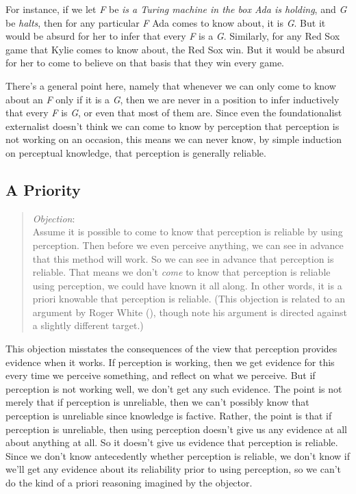 \documentclass[
  10pt,
  letterpaper,
  twoside]{scrbook}
\begin{document}
For instance, if we let \emph{F} be \emph{is a Turing machine in the box
Ada is holding}, and \emph{G} be \emph{halts}, then for any particular
\emph{F} {Ada} comes to know about, it is \emph{G}. But it would be
absurd for her to infer that every \emph{F} is a \emph{G}. Similarly,
for any Red Sox game that {Kylie} comes to know about, the Red Sox win.
But it would be absurd for her to come to believe on that basis that
they win every game.

There's a general point here, namely that whenever we can only come to
know about an \emph{F} only if it is a \emph{G}, then we are never in a
position to infer inductively that every \emph{F} is \emph{G}, or even
that most of them are. Since even the foundationalist externalist
doesn't think we can come to know by perception that perception is not
working on an occasion, this means we can never know, by simple
induction on perceptual knowledge, that perception is generally
reliable.

\subsection{A Priority}\label{apriority}

\begin{quote}
\emph{Objection}:\\
Assume it is possible to come to know that perception is reliable by
using perception. Then before we even perceive anything, we can see in
advance that this method will work. So we can see in advance that
perception is reliable. That means we don't \emph{come} to know that
perception is reliable using perception, we could have known it all
along. In other words, it is a priori knowable that perception is
reliable. (This objection is related to an argument by Roger White
(), though note his argument is directed
against a slightly different target.)
\end{quote}

This objection misstates the consequences of the view that perception
provides evidence when it works. If perception is working, then we get
evidence for this every time we perceive something, and reflect on what
we perceive. But if perception is not working well, we don't get any
such evidence. The point is not merely that if perception is unreliable,
then we can't possibly know that perception is unreliable since
knowledge is factive. Rather, the point is that if perception is
unreliable, then using perception doesn't give us any evidence at all
about anything at all. So it doesn't give us evidence that perception is
reliable. Since we don't know antecedently whether perception is
reliable, we don't know if we'll get any evidence about its reliability
prior to using perception, so we can't do the kind of a priori reasoning
imagined by the objector.
\end{document}
